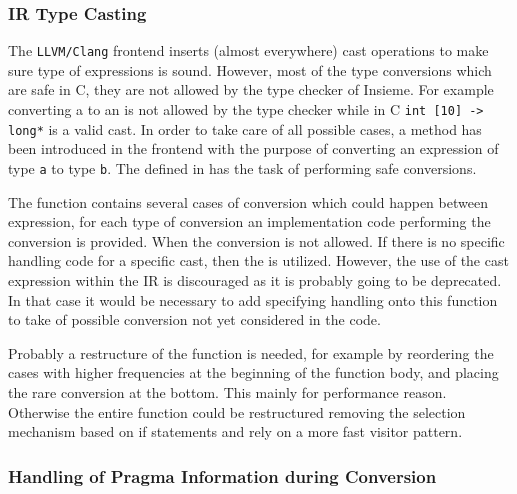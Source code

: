\subsubsection{IR Type Casting}
The {\tt LLVM/Clang} frontend inserts (almost everywhere) cast operations to
make sure type of expressions is sound. However, most of the type conversions
which are safe in C, they are not allowed by the type checker of Insieme. For
example converting a  to an  is
not allowed by the type checker while in C {\tt int [10] -> long*} is a valid
cast. In order to take care of all possible cases, a method has been introduced
in the frontend with the purpose of converting an expression of type {\tt a}
to type {\tt b}. The  defined in  has the task of
performing safe conversions. 

The function contains several cases of conversion which could happen between
expression, for each type of conversion an implementation code performing the
conversion is provided. When the conversion is not allowed. If there is no
specific handling code for a specific cast, then the  is
utilized. However, the use of the cast expression within the IR is discouraged
as it is probably going to be deprecated. In that case it would be necessary to
add specifying handling onto this function to take of possible conversion not yet
considered in the code. 

Probably a restructure of the function is needed, for example by reordering the
cases with higher frequencies at the beginning of the function body, and placing
the rare conversion at the bottom. This mainly for performance reason. Otherwise
the entire function could be restructured removing the selection mechanism based
on if statements and rely on a more fast visitor pattern. 

\subsubsection{Handling of Pragma Information during Conversion}
 
